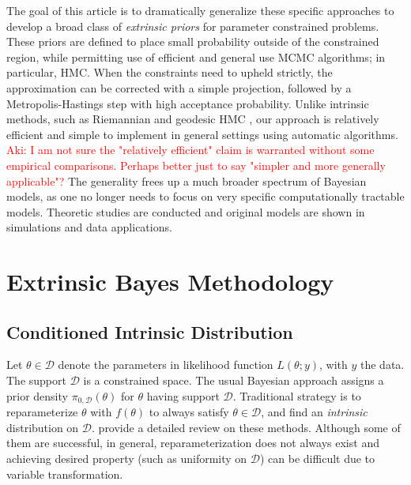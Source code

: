 \documentclass[10pt]{article}
\newcommand{\aki}[1]{\textcolor{red}{Aki: #1}}
\newcommand{\mc}[1]{\mathcal{#1}}
\DeclareMathOperator{\1}{\mathbbm{1}}
\begin{document}
The goal of this article is to dramatically generalize these specific approaches to develop a broad class of {\em extrinsic priors} for parameter constrained problems. These priors are defined to place small probability outside of the constrained region, while permitting use of efficient and general use MCMC algorithms; in particular, HMC. When the constraints need to upheld strictly, the approximation can be corrected with a simple projection, followed by a Metropolis-Hastings step with high acceptance probability.
Unlike intrinsic methods, such as Riemannian and geodesic HMC \citep{girolami2011riemann,byrne2013geodesic}, our approach is
relatively efficient and simple to implement in general settings using automatic algorithms. \aki{I am not sure the "relatively efficient" claim is warranted without some empirical comparisons. Perhaps better just to say "simpler and more generally applicable"?} The generality frees up a much broader spectrum of Bayesian models, as one no longer needs to focus on very specific computationally tractable models.
Theoretic studies are conducted and original models are shown in simulations and data applications.

\section{Extrinsic Bayes Methodology}

\subsection{Conditioned Intrinsic Distribution}

Let $\theta \in \mc D$ denote the parameters in likelihood function $L(\theta;y)$, with $y$ the data. The support $\mc D$ is a constrained space. The usual Bayesian approach assigns a prior density $\pi_{0,\mc D}(\theta)$ for $\theta$ having support $\mc D$. Traditional strategy is to reparameterize $\theta$ with $f(\theta)$ to always satisfy $\theta \in \mc D$, and find an {\it intrinsic} distribution on $\mc D$. \cite{diaconis2013manifold} provide a detailed review on these methods. Although some of them are successful, in general, reparameterization does not always exist and achieving desired property (such as uniformity on $\mc D$) can be difficult due to variable transformation.
\end{document}
